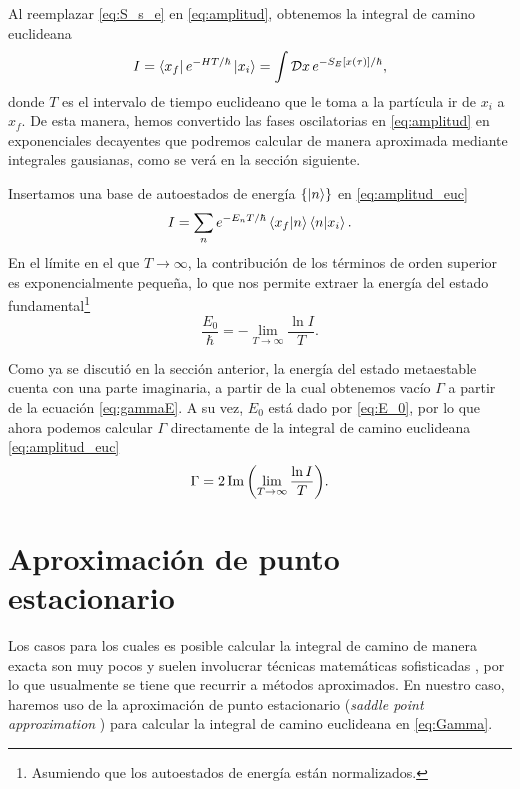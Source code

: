 Al reemplazar \eqref{eq:S_s_e} en \eqref{eq:amplitud}, obtenemos la integral de camino euclideana \cite{das2006field}
\begin{equation}\label{eq:amplitud_euc}
I = \bra{x_f}e^{-HT/\hbar}\ket{x_i} = \int \mathcal{D}x \, e^{-S_E\qty[x\qty(\tau)]/\hbar},
\end{equation}
donde $T$ es el intervalo de tiempo euclideano que le toma a la partícula ir de $x_i$ a $x_f$. De esta manera, hemos convertido las fases oscilatorias en \eqref{eq:amplitud} en exponenciales decayentes que podremos calcular de manera aproximada mediante integrales gausianas, como se verá en la sección siguiente.

Insertamos una base de autoestados de energía $\qty{\ket{n}}$ en \eqref{eq:amplitud_euc} \cite{coleman1977fate}
\begin{equation}\label{eq:Eeigen}
I = \sum_n e^{-E_n T/\hbar} \bra{x_f}\ket{n}\bra{n}\ket{x_i}.
\end{equation}
En el límite en el que $T \rightarrow \infty$, 
la contribución de los términos de orden superior es exponencialmente pequeña, lo que nos permite extraer la energía del estado fundamental\footnote{Asumiendo que los autoestados de energía están normalizados.} \cite{andreassen2017precision}
\begin{equation} \label{eq:E_0}
	\frac{E_0}{\hbar} = -\lim_{T \rightarrow \infty} \frac{ \ln I}{T}.
\end{equation}

Como ya se discutió en la sección anterior,  %
la energía del estado metaestable cuenta con una parte imaginaria, a partir de la cual obtenemos vacío $\Gamma$ a partir de la ecuación \eqref{eq:gammaE}. A su vez, $E_0$ está dado por \eqref{eq:E_0}, por lo que ahora podemos calcular $\Gamma$ directamente de la integral de camino euclideana \eqref{eq:amplitud_euc}
\begin{equation} \label{eq:Gamma}
	\Gamma = 2\Im\qty(\lim_{T \rightarrow \infty} \frac{ \ln I}{T}).
\end{equation}

\section{Aproximación de punto estacionario}

Los casos para los cuales es posible calcular la integral de camino de manera exacta son muy pocos y suelen involucrar técnicas matemáticas sofisticadas \cite{feynman2010quantum, das2006field, kleinert2009path}, por lo que usualmente se tiene que recurrir a métodos aproximados. En nuestro caso, haremos uso de la aproximación de punto estacionario (\emph{saddle point approximation} 
) para calcular la integral de camino euclideana en \eqref{eq:Gamma}. 

